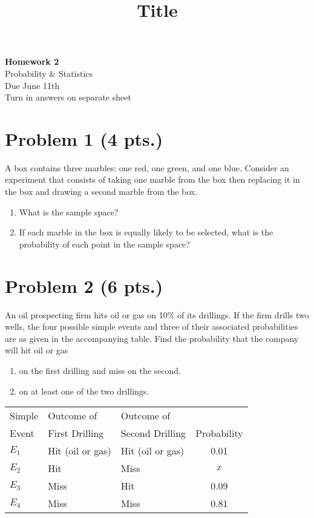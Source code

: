 \documentclass[11pt]{article}
\theoremstyle{definition}
\begin{document}
\title{Title}

\thispagestyle{empty}

\begin{center}
{\LARGE \bf Homework 2} \\
{\large Probability \& Statistics} \\
{\large Due June 11th} \\
{\large Turn in answers on separate sheet}
\end{center}

\section*{Problem 1 (4 pts.)}

A box contains three marbles: one red, one green, and one blue. Consider an experiment that consists of taking one marble from the box then replacing it in the box and drawing a second marble from the box.

\begin{enumerate}
	\item What is the sample space?
	\item If each marble in the box is equally likely to be selected, what is the probability of each point in the sample space?
\end{enumerate}

\section*{Problem 2 (6 pts.)}

An oil prospecting firm hits oil or gas on 10\% of its drillings. If the firm drills two wells, the four possible simple events and three of their associated probabilities are as given in the accompanying table. Find the probability that the company will hit oil or gas

\begin{enumerate}
	\item on the first drilling and miss on the second.
	\item on at least one of the two drillings.
\end{enumerate}

\begin{table}[H]
	\centering
	\begin{tabular}{lllc}
		\hline
		Simple & Outcome of & Outcome of & \\
		Event & First Drilling & Second Drilling & Probability \\
		\hline
		$E_1$ & Hit (oil or gas) & Hit (oil or gas) & 0.01 \\
		$E_2$ & Hit & Miss & $x$ \\
		$E_3$ & Miss & Hit & 0.09 \\
		$E_4$ & Miss & Miss & 0.81 \\
		\hline
	\end{tabular}
\end{table}
\end{document}
